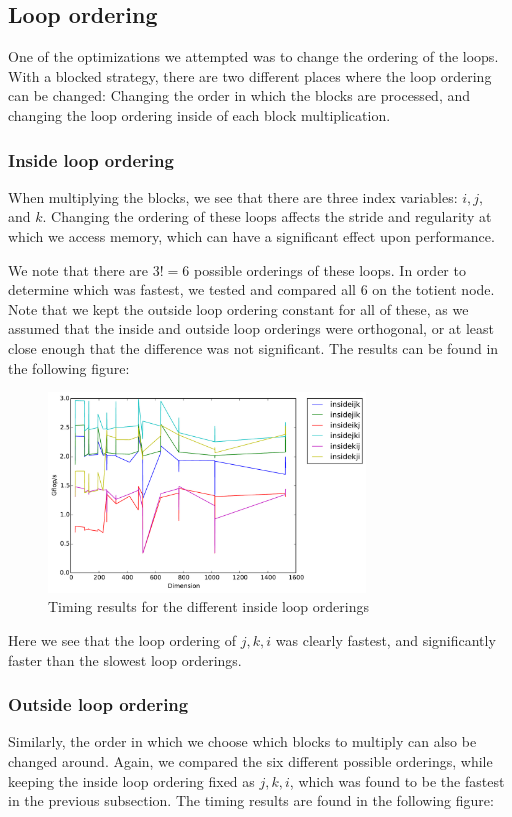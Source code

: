 \subsection{Loop ordering}\label{sec:loopordering}
One of the optimizations we attempted was to change the ordering of the loops.
With a blocked strategy, there are two different places where the loop ordering
can be changed: Changing the order in which the blocks are processed, and
changing the loop ordering inside of each block multiplication.

\subsubsection{Inside loop ordering}
When multiplying the blocks, we see that there are three index variables:
$i,j,$ and $k$. Changing the ordering of these loops affects the stride and
regularity at which we access memory, which can have a significant effect upon
performance.

We note that there are $3! = 6$ possible orderings of these loops. In order to
determine which was fastest, we tested and compared all 6 on the totient node.
Note that we kept the outside loop ordering constant for all of these, as we
assumed that the inside and outside loop orderings were orthogonal, or at least
close enough that the difference was not significant. The results can be found
in the following figure:

\begin{figure}[hh]
\includegraphics[width=0.75\textwidth]{timing_insideloops.pdf}
\caption{Timing results for the different inside loop orderings}
\end{figure}
Here we see that the loop ordering of $j,k,i$ was clearly fastest, and
significantly faster than the slowest loop orderings.

\newpage
\subsubsection{Outside loop ordering}
Similarly, the order in which we choose which blocks to multiply can also be
changed around. Again, we compared the six different possible orderings, while
keeping the inside loop ordering fixed as $j,k,i$, which was found to be the
fastest in the previous subsection. The timing results are found in the
following figure:

